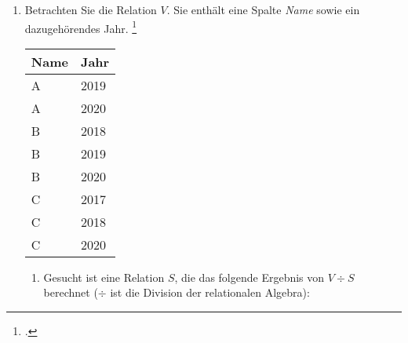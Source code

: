 \documentclass{bschlangaul-aufgabe}
\begin{document}

\begin{enumerate}


\begin{verbatim}
CREATE TABLE V (
  Name VARCHAR(1),
  Jahr integer
);

CREATE TABLE S (
  Jahr integer
);

INSERT INTO V VALUES
  ('A', 2019),
  ('A', 2020),
  ('B', 2018),
  ('B', 2019),
  ('B', 2020),
  ('C', 2017),
  ('C', 2018),
  ('C', 2020);

INSERT INTO S VALUES
  (2018),
  (2019),
  (2020);
\end{verbatim}

\item Betrachten Sie die Relation $V$. Sie enthält eine Spalte
\emph{Name} sowie ein dazugehörendes Jahr.
\footcite{examen:66116:2020:09}

\begin{center}
\begin{tabular}{|l|l|}
\hline
Name & Jahr \\\hline\hline
A & 2019 \\\hline
A & 2020 \\\hline
B & 2018 \\\hline
B & 2019 \\\hline
B & 2020 \\\hline
C & 2017 \\\hline
C & 2018 \\\hline
C & 2020 \\\hline
\end{tabular}
\end{center}

\begin{enumerate}


\item Gesucht ist eine Relation $S$, die das folgende Ergebnis von $V
\div S$ berechnet ($\div$ ist die Division der relationalen Algebra):


\end{enumerate}
\end{enumerate}
\end{document}
